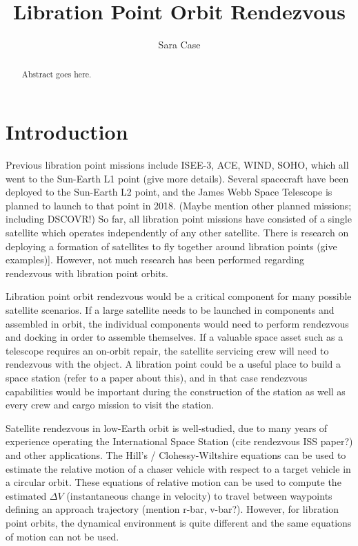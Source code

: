 \documentclass[]{article}
\title{Libration Point Orbit Rendezvous}
\author{Sara Case}
\begin{document}
\maketitle

\begin{abstract}
	
	Abstract goes here.

\end{abstract}

\section{Introduction}

Previous libration point missions include ISEE-3, ACE, WIND, SOHO, which all went to the Sun-Earth L1 point (give more details).  Several spacecraft have been deployed to the Sun-Earth L2 point, and the James Webb Space Telescope is planned to launch to that point in 2018.  (Maybe mention other planned missions; including DSCOVR!)  So far, all libration point missions have consisted of a single satellite which operates independently of any other satellite.  There is research on deploying a formation of satellites to fly together around libration points (give examples)].  However, not much research has been performed regarding rendezvous with libration point orbits.

Libration point orbit rendezvous would be a critical component for many possible satellite scenarios.  If a large satellite needs to be launched in components and assembled in orbit, the individual components would need to perform rendezvous and docking in order to assemble themselves.  If a valuable space asset such as a telescope requires an on-orbit repair, the satellite servicing crew will need to rendezvous with the object.  A libration point could be a useful place to build a space station (refer to a paper about this), and in that case rendezvous capabilities would be important during the construction of the station as well as every crew and cargo mission to visit the station.

Satellite rendezvous in low-Earth orbit is well-studied, due to many years of experience operating the International Space Station (cite rendezvous ISS paper?) and other applications.  The Hill's / Clohessy-Wiltshire equations can be used to estimate the relative motion of a chaser vehicle with respect to a target vehicle in a circular orbit.  These equations of relative motion can be used to compute the estimated \(\Delta V\) (instantaneous change in velocity) to travel between waypoints defining an approach trajectory (mention r-bar, v-bar?).  However, for libration point orbits, the dynamical environment is quite different and the same equations of motion can not be used.
\end{document}
